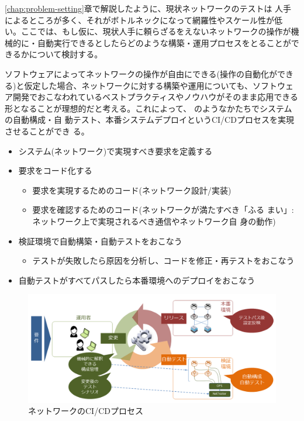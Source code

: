 
\ref{chap:problem-setting}章で解説したように、現状ネットワークのテストは
人手によるところが多く、それがボトルネックになって網羅性やスケール性が低
い。ここでは、もし仮に、現状人手に頼らざるをえないネットワークの操作が機
械的に・自動実行できるとしたらどのような構築・運用プロセスをとることがで
きるかについて検討する。

ソフトウェアによってネットワークの操作が自由にできる(操作の自動化ができ
る)と仮定した場合、ネットワークに対する構築や運用についても、ソフトウェ
ア開発でおこなわれているベストプラクティスやノウハウがそのまま応用できる
形となることが理想的だと考える。これによって、
のようなかたちでシステムの自動構成・自
動テスト、本番システムデプロイというCI/CDプロセスを実現させることができ
る。
\begin{itemize}
 \item システム(ネットワーク)で実現すべき要求を定義する
 \item 要求をコード化する
       \begin{itemize}
        \item 要求を実現するためのコード(ネットワーク設計/実装)
        \item 要求を確認するためのコード(ネットワークが満たすべき「ふる
              まい」: ネットワーク上で実現されるべき通信やネットワーク自
              身の動作)
       \end{itemize}
 \item 検証環境で自動構築・自動テストをおこなう
       \begin{itemize}
        \item テストが失敗したら原因を分析し、コードを修正・再テストをおこなう
       \end{itemize}
 \item 自動テストがすべてパスしたら本番環境へのデプロイをおこなう
\end{itemize}

\begin{figure}[h]
 \centering
 \includegraphics[scale=0.5]{img/desired-cicd-process.png}
 \caption{ネットワークのCI/CDプロセス}
 \label{fig:desired-cicd-process}
\end{figure}

